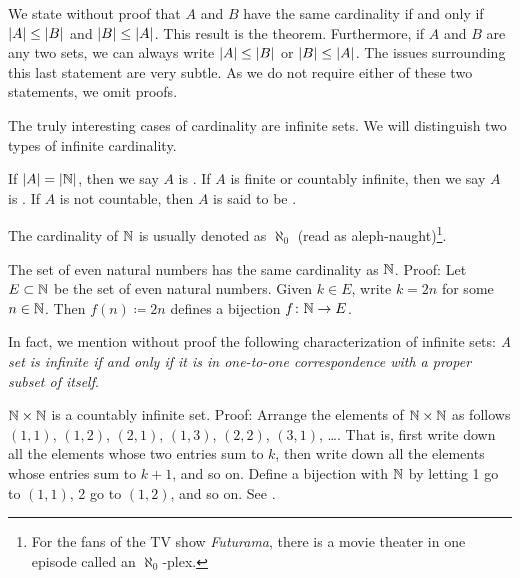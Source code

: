 We state without proof that
$A$ and $B$ have the same cardinality if and only if
$\lvert {A} \rvert \leq \lvert {B} \rvert$ and
$\lvert {B} \rvert \leq \lvert {A} \rvert$.  This result is the
 theorem.
Furthermore, if $A$ and $B$ are any two sets,
we can always write $\lvert {A} \rvert \leq \lvert {B} \rvert$ or
$\lvert {B} \rvert \leq \lvert {A} \rvert$.  The issues surrounding this
last statement are very subtle.  As we do not require either
of these two statements, we omit proofs.

The truly interesting cases of cardinality are infinite sets.
We will distinguish two types of infinite cardinality.

\begin{defn}
If $\lvert {A} \rvert = \lvert {{\mathbb{N}}} \rvert$, then we say $A$ is
\emph{}.
If $A$ is finite or countably infinite, then we say $A$
is \emph{}.
If $A$ is not countable, then
$A$ is said to be \emph{}.
\end{defn}

The cardinality of ${\mathbb{N}}$ is usually denoted as
$\aleph_0$ (read as aleph-naught)\footnote{For the fans of the TV show
\emph{Futurama}, there is a movie theater in one episode
called an $\aleph_0$-plex.}.

\begin{example}
The set of even natural numbers has the same cardinality as ${\mathbb{N}}$.  Proof:
Let $E \subset {\mathbb{N}}$ be the set of even natural numbers.
Given $k \in E$, write $k=2n$ for some $n \in {\mathbb{N}}$.
Then $f(n) \coloneqq 2n$ defines a bijection $f \colon {\mathbb{N}} \to E$.
\end{example}

In fact, we mention without proof the following characterization
of infinite sets: \emph{A set is infinite if and only if it is in one-to-one
correspondence with a proper subset of itself}.

\begin{example}
$\N \times \N$ is a countably infinite set.  Proof: Arrange the
elements of $\N \times \N$ as follows
$(1,1)$, $(1,2)$, $(2,1)$, $(1,3)$, $(2,2)$, $(3,1)$, \ldots.  That is,
first write down all the elements whose two entries sum to $k$,
then write down all the elements whose entries sum to $k+1$, and so on.
Define a bijection with ${\mathbb{N}}$ by letting 1 go to $(1,1)$,
2 go to $(1,2)$, and so on.  See .
\begin{myfigureht}
\caption{Showing $\N \times \N$ is countable.\label{fig:NcrossNcard}}
\end{myfigureht}
\end{example}

